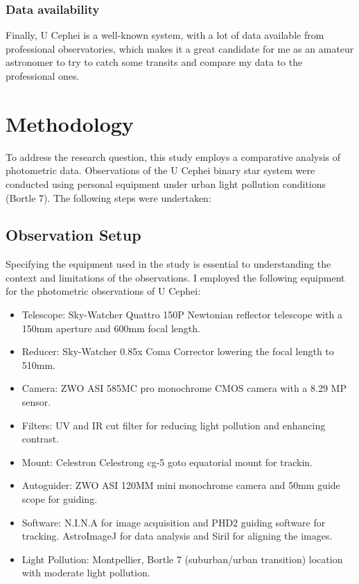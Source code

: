 \documentclass[12pt,a4paper]{article}
\begin{document}
\subsubsection{Data availability}

Finally, U Cephei is a well-known system, with a lot of data available from professional observatories, which makes it a great candidate for me as an amateur astronomer to try to catch some transits and compare my data to the professional ones.

\section{Methodology}
To address the research question, this study employs a comparative analysis of photometric data. Observations of the U Cephei binary star system were conducted using personal equipment under urban light pollution conditions (Bortle 7). The following steps were undertaken:

\subsection{Observation Setup}

Specifying the equipment used in the study is essential to understanding the context and limitations of the observations. 
I employed the following equipment for the photometric observations of U Cephei:

\begin{itemize}
    \item Telescope: Sky-Watcher Quattro 150P Newtonian reflector telescope with a 150mm aperture and 600mm focal length.
    \item Reducer: Sky-Watcher 0.85x Coma Corrector lowering the focal length to 510mm.
    \item Camera: ZWO ASI 585MC pro monochrome CMOS camera with a 8.29 MP sensor.
    \item Filters: UV and IR cut filter for reducing light pollution and enhancing contrast.
    \item Mount: Celestron Celestrong cg-5 goto equatorial mount for trackin.
    \item Autoguider: ZWO ASI 120MM mini monochrome camera and 50mm guide scope for guiding.
    \item Software: N.I.N.A for image acquisition and PHD2 guiding software for tracking. AstroImageJ for data analysis and Siril for aligning the images.
    \item Light Pollution: Montpellier, Bortle 7 (suburban/urban transition) location with moderate light pollution.
\end{itemize}
\end{document}
